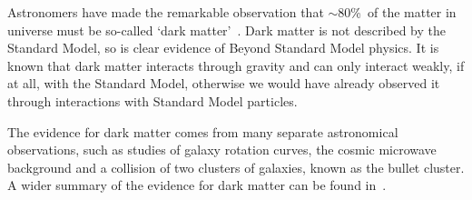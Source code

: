 

Astronomers have made the remarkable observation that
$\sim$80\%~of the matter in universe must be so-called `dark matter'~\cite{theo-bsm_dm_peskin}.
Dark matter is not described by the Standard Model,
so is clear evidence of Beyond Standard Model physics.
It is known that dark matter interacts through gravity
and can only interact weakly, if at all, with the Standard Model,
otherwise we would have already observed it through interactions with Standard Model particles.

The evidence for dark matter comes from many separate astronomical observations,
such as studies of
galaxy rotation curves,
the cosmic microwave background
and a collision of two clusters of galaxies, known as the bullet cluster.
A wider summary of the evidence for dark matter can be found in~\cite{theo-bsm_dm_evidence}.

